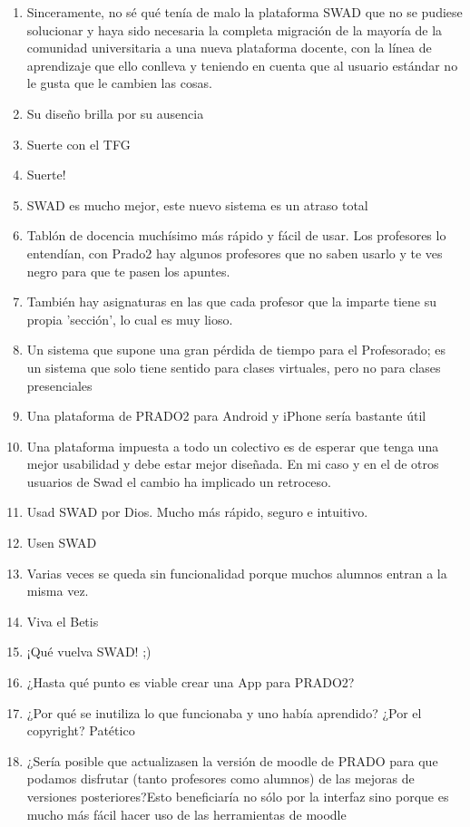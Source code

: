 \begin{enumerate}
\item Sinceramente, no sé qué tenía de malo la plataforma SWAD que no se pudiese solucionar y haya sido necesaria la completa migración de la mayoría de la comunidad universitaria a una nueva plataforma docente, con la línea de aprendizaje que ello conlleva y teniendo en cuenta que al usuario estándar no le gusta que le cambien las cosas.
\item Su diseño brilla por su ausencia
\item Suerte con el TFG
\item Suerte!
\item SWAD es mucho mejor, este nuevo sistema es un atraso total
\item Tablón de docencia muchísimo más rápido y fácil de usar. Los profesores lo entendían, con Prado2 hay algunos profesores que no saben usarlo y te ves negro para que te pasen los apuntes. 
\item También hay asignaturas en las que cada profesor que la imparte tiene su propia 'sección', lo cual es muy lioso.
\item Un sistema que supone una gran pérdida de tiempo para el Profesorado; es un sistema que solo tiene sentido para clases virtuales, pero no para clases presenciales
\item Una plataforma de PRADO2 para Android y iPhone sería bastante útil
\item Una plataforma impuesta a todo un colectivo es de esperar que tenga una mejor usabilidad y debe estar mejor diseñada. En mi caso y en el de otros usuarios de Swad el cambio ha implicado un retroceso.
\item Usad SWAD por Dios. Mucho más rápido, seguro e intuitivo.
\item Usen SWAD
\item Varias veces se queda sin funcionalidad porque muchos alumnos entran a la misma vez.
\item Viva el Betis
\item ¡Qué vuelva SWAD! ;)
\item ¿Hasta qué punto es viable crear una App para PRADO2?
\item ¿Por qué se inutiliza lo que funcionaba y uno había aprendido? ¿Por el copyright? Patético
\item ¿Sería posible que actualizasen la versión de moodle de PRADO para que podamos disfrutar (tanto profesores como alumnos) de las mejoras de versiones posteriores?Esto beneficiaría no sólo por la interfaz sino porque es mucho más fácil hacer uso de las herramientas de moodle
\end{enumerate}




